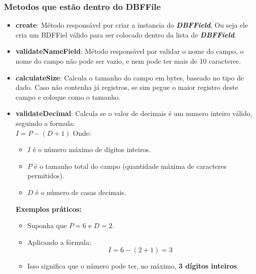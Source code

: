 \subsubsection{Metodos que estão dentro do DBFFile}
\begin{itemize}
    \item \textbf{create}: Método responsável por criar a instancia do \textit{\textbf{DBFField}}, Ou seja ele cria um BDFFiel válido para ser colocado dentro da lista de \textit{\textbf{DBFField}}.
    \item \textbf{validateNameField}: Método responsável por validar o nome do campo, o nome do campo não pode ser vazio, e nem pode ter mais de 10 caracteres. 
    \item \textbf{calculateSize}: Calcula o tamanho do campo em bytes, baseado no tipo de dado. Caso não contenha já registros, se sim pegue o maior registro deste campo e coloque como o tamanho.
    \item \textbf{validateDecimal}: Calcula se o valor de decimais é um numero inteiro válido, seguindo a formula: \\
    \subitem \( I = P - (D + 1) \)  
    \subitem Onde:  
    \begin{itemize}
        \item \( I \) é o número máximo de dígitos inteiros.  
        \item \( P \) é o tamanho total do campo (quantidade máxima de caracteres permitidos).  
        \item \( D \) é o número de casas decimais.  
    \end{itemize}
    
    \subitem \textbf{Exemplos práticos: } 
    \begin{itemize}
        \item Suponha que \( P = 6 \) e \( D = 2 \).  
        \item Aplicando a fórmula:  
        \[
        I = 6 - (2 + 1) = 3
        \]
        \item Isso significa que o número pode ter, no máximo, \textbf{3 dígitos inteiros}.  
    \end{itemize}
    

\end{itemize}
